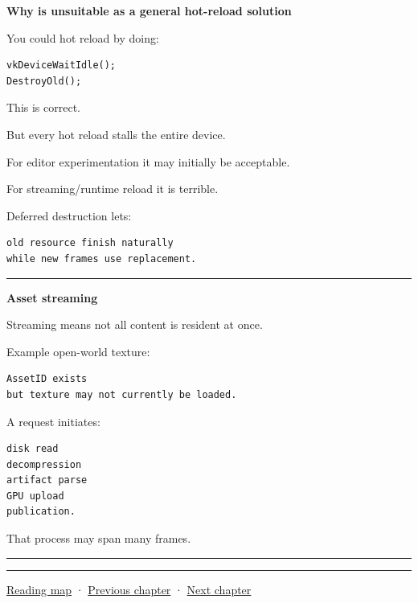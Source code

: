 \textbf{Why  is unsuitable as a general hot-reload solution}

You could hot reload by doing:

\begin{verbatim}
vkDeviceWaitIdle();
DestroyOld();
\end{verbatim}

This is correct.

But every hot reload stalls the entire device.

For editor experimentation it may initially be acceptable.

For streaming/runtime reload it is terrible.

Deferred destruction lets:

\begin{verbatim}
old resource finish naturally
while new frames use replacement.
\end{verbatim}

\begin{center}\rule{0.5\linewidth}{0.5pt}\end{center}

\textbf{Asset streaming}

Streaming means not all content is resident at once.

Example open-world texture:

\begin{verbatim}
AssetID exists
but texture may not currently be loaded.
\end{verbatim}

A request initiates:

\begin{verbatim}
disk read
decompression
artifact parse
GPU upload
publication.
\end{verbatim}

That process may span many frames.

\begin{center}\rule{0.5\linewidth}{0.5pt}\end{center}

\begin{center}\rule{0.5\linewidth}{0.5pt}\end{center}

\hyperref[volume-reading-map]{Reading map} · \hyperref[05-engine-i-ch009-player-choices-rules-and-readable-feedback]{Previous chapter} · \hyperref[05-engine-i-ch011-streaming-resources-through-explicit-states]{Next chapter}
